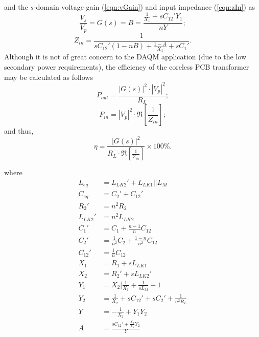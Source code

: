 \documentclass[conference]{IEEEtran}
\begin{document}
\hspace{-20pt} and the $s$-domain voltage gain (\ref{eqn:vGain}) and input impedance (\ref{eqn:zIn}) as
%
\begin{equation}
	\label{eqn:vGain}
	\frac{V_{s}}{V_{p}} = G(s) = B = \frac{\frac{1}{X_{1}}+sC_{12}'Y_{1}}{nY};
\end{equation}
%
\begin{equation}
	\label{eqn:zIn}
	Z_{in} = \frac{1}{sC_{12}'(1-nB)+\frac{1-A}{X_{1}}+sC_{1}'}.
\end{equation}
%
Although it is not of great concern to the DAQM application (due to the low secondary power requirements), the efficiency of the coreless PCB transformer may be calculated as follows
\begin{equation}
	P_{out} = \frac{|G(s)|^{2}\cdot|V_{p}|^{2}}{R_{L}};
\end{equation}
\begin{equation}
	P_{in} = |V_{p}|^{2}\cdot\Re \left[ \frac{1}{Z_{in}} \right];
\end{equation}
and thus, \\
\begin{equation}
	\eta = \frac{|G(s)|^{2}}{R_{L}\cdot\Re \left[ \frac{1}{Z_{in}} \right]}\times 100 \%.
\end{equation}

\hspace{-20pt} where \\

\begin{align*}
	L_{eq}   &= L_{LK2}'+L_{LK1}||L_{M} 	\\
	C_{eq}   &= C_{2}'+C_{12}'				\\
	R_{2}'   &= n^{2}R_{2}					\\
	L_{LK2}' &= n^{2}L_{LK2}				\\
	C_{1}'   &= C_{1} + \frac{n-1}{n}C_{12}	\\
	C_{2}'   &= \frac{1}{n^{2}}C_{2} + \frac{1-n}{n^{2}}C_{12}	\\
	C_{12}'  &= \frac{1}{n}C_{12}			\\
	X_{1}    &= R_{1}  + sL_{LK1}			\\
	X_{2}    &= R_{2}' + sL_{LK2}'			\\
	Y_{1}    &= X_{2} \lbrack \frac{1}{X_{1}} + \frac{1}{sL_{M}}+1	\\
	Y_{2}    &= \frac{1}{X_{2}} + sC_{12}' + sC_{2}' + \frac{1}{n^{2}R_{L}}	\\
	Y        &= -\frac{1}{X_{2}} + Y_{1}Y_{2}	\\
	A        &= \frac{sC_{12}' + \frac{X_{2}}{X_{1}} Y_{2}}{Y}
\end{align*}
\end{document}
